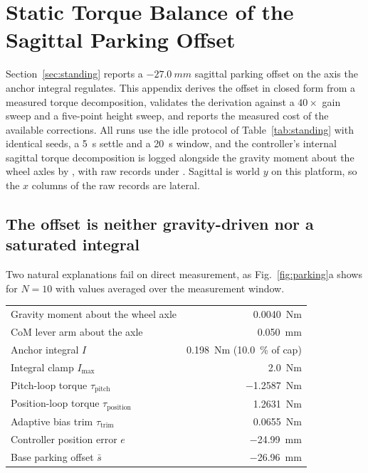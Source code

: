\documentclass[a4paper,fleqn]{cas-dc}
\begin{document}
\section{Static Torque Balance of the Sagittal Parking Offset}
\label{sec:parking_supp}

Section~\ref{sec:standing} reports a $\SI{-27.0}{mm}$ sagittal parking offset on
the axis the anchor integral regulates. This appendix derives the offset in
closed form from a measured torque decomposition, validates the derivation
against a $40{\times}$ gain sweep and a five-point height sweep, and reports the
measured cost of the available corrections. All runs use the idle protocol of
Table~\ref{tab:standing} with identical seeds, a \SI{5}{s} settle and a
\SI{20}{s} window, and the controller's internal sagittal torque decomposition
is logged alongside the gravity moment about the wheel axles by
, with raw records under
. Sagittal is world $y$ on this platform,
so the $x$ columns of the raw records are lateral.

\subsection{The offset is neither gravity-driven nor a saturated integral}

Two natural explanations fail on direct measurement, as Fig.~\ref{fig:parking}a
shows for $N{=}10$ with values averaged over the measurement window.

\begin{center}\footnotesize
\begin{tabular}{lr}
\hline
Gravity moment about the wheel axle & \SI{+0.0040}{Nm} \\
CoM lever arm about the axle & \SI{0.050}{mm} \\
Anchor integral $I$ & \SI{0.198}{Nm} (\SI{10.0}{\percent} of cap) \\
Integral clamp $I_{\max}$ & \SI{2.0}{Nm} \\
Pitch-loop torque $\tau_{\text{pitch}}$ & \SI{-1.2587}{Nm} \\
Position-loop torque $\tau_{\text{position}}$ & \SI{+1.2631}{Nm} \\
Adaptive bias trim $\tau_{\text{trim}}$ & \SI{+0.0655}{Nm} \\
Controller position error $e$ & \SI{-24.99}{mm} \\
Base parking offset $\bar{s}$ & \SI{-26.96}{mm} \\
\hline
\end{tabular}
\end{center}
\end{document}
